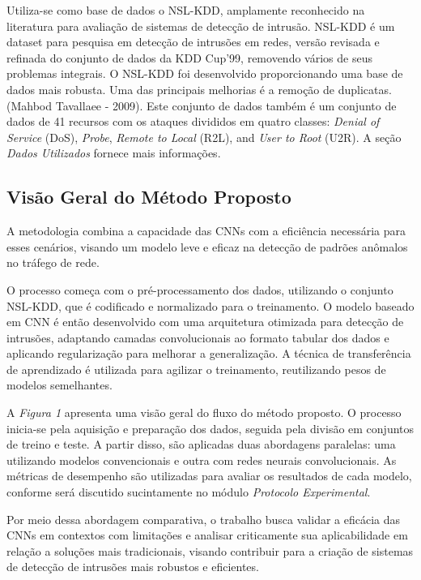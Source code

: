 \documentclass[conference]{IEEEtran}
\begin{document}
    Utiliza-se como base de dados o NSL-KDD, amplamente reconhecido na literatura para avaliação de sistemas de detecção de intrusão. NSL-KDD é um dataset para pesquisa em detecção de intrusões em redes, versão revisada e refinada do conjunto de dados da KDD Cup'99, removendo vários de seus problemas integrais. O NSL-KDD foi desenvolvido proporcionando uma base de dados mais robusta. Uma das principais melhorias é a remoção de duplicatas. (Mahbod Tavallaee - 2009).
    Este conjunto de dados também é um conjunto de dados de 41 recursos com os ataques divididos em quatro classes:\textit{ Denial of Service }(DoS),\textit{ Probe},\textit{ Remote to Local} (R2L), and \textit{User to Root} (U2R). A seção\textit{ Dados Utilizados} fornece mais informações.

\subsection{Visão Geral do Método Proposto}
    
    A metodologia combina a capacidade das CNNs com a eficiência necessária para esses cenários, visando um modelo leve e eficaz na detecção de padrões anômalos no tráfego de rede.
    
    O processo começa com o pré-processamento dos dados, utilizando o conjunto NSL-KDD, que é codificado e normalizado para o treinamento. O modelo baseado em CNN é então desenvolvido com uma arquitetura otimizada para detecção de intrusões, adaptando camadas convolucionais ao formato tabular dos dados e aplicando regularização para melhorar a generalização. A técnica de transferência de aprendizado é utilizada para agilizar o treinamento, reutilizando pesos de modelos semelhantes.

    A \textit{Figura 1} apresenta uma visão geral do fluxo do método proposto. O processo inicia-se pela aquisição e preparação dos dados, seguida pela divisão em conjuntos de treino e teste. A partir disso, são aplicadas duas abordagens paralelas: uma utilizando modelos convencionais e outra com redes neurais convolucionais. As métricas de desempenho são utilizadas para avaliar os resultados de cada modelo, conforme será discutido sucintamente no módulo \textit{Protocolo Experimental}.

    Por meio dessa abordagem comparativa, o trabalho busca validar a eficácia das CNNs em contextos com limitações e analisar criticamente sua aplicabilidade em relação a soluções mais tradicionais, visando contribuir para a criação de sistemas de detecção de intrusões mais robustos e eficientes.
    
\end{document}
